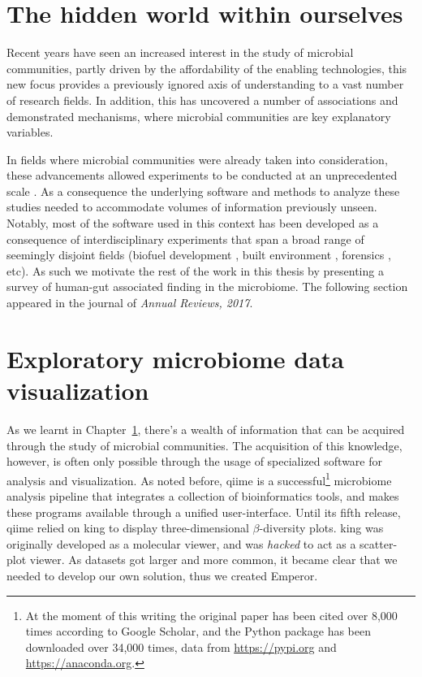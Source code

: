 \documentclass[12pt,chapterheads]{ucsd}
\begin{document}
%




\chapter{The hidden world within ourselves}\label{chapter_review}

Recent years have seen an increased interest in the study of microbial
communities, partly driven by the affordability of the enabling technologies,
this new focus provides a previously ignored axis of understanding to a vast
number of research fields. In addition, this has uncovered a number of
associations and demonstrated mechanisms, where microbial communities are key
explanatory variables.

In fields where microbial communities were already taken into consideration,
these advancements allowed experiments to be conducted at an unprecedented 
scale \cite{RN35, RN4061, RN4267}. As a consequence the underlying software and 
methods to analyze these studies needed to accommodate volumes of information
previously unseen. Notably, most of the software used in this context has been
developed as a consequence of interdisciplinary experiments that span a broad
range of seemingly disjoint fields (biofuel development \cite{RN4268}, built 
environment \cite{RN4270, RN4083}, forensics \cite{RN4269, RN4271}, etc).  As 
such we motivate the rest of the work in this thesis by presenting a survey of 
human-gut associated finding in the microbiome.  The following section 
appeared in the journal of \textsl{Annual Reviews, 2017}.



\chapter{Exploratory microbiome data visualization}\label{exploratory_chapter}

As we learnt in Chapter~\ref{chapter_review}, there's a wealth of information 
that can be acquired through the study of microbial communities. The 
acquisition of this knowledge, however, is often only possible through the 
usage of specialized software for analysis and visualization. As noted before, 
\gls{qiime} is a successful\footnote{At the moment of this writing the original 
paper has been cited over 8,000 times according to Google Scholar, and the 
Python package has been downloaded over 34,000 times, data from 
\url{https://pypi.org} and \url{https://anaconda.org}.} microbiome analysis 
pipeline that integrates a collection of bioinformatics tools, and makes these 
programs available through a unified user-interface. Until its fifth release, 
\gls{qiime} relied on \gls{king} to display three-dimensional $\beta$-diversity 
plots. \gls{king} was originally developed as a molecular viewer, and was 
\textit{hacked} to act as a scatter-plot viewer. As datasets got larger and 
more common, it became clear that we needed to develop our own solution, thus 
we created Emperor.
\end{document}
